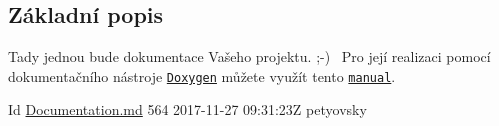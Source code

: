 \subsection*{Základní popis}

Tady jednou bude dokumentace Vašeho projektu. ;-\/)~\newline
Pro její realizaci pomocí dokumentačního nástroje \href{http://www.doxygen.org}{\tt Doxygen} můžete využít tento \href{http://www.doxygen.org/manual/index.html}{\tt manual}.

\begin{DoxyParagraph}{Id}
\hyperlink{_documentation_8md}{Documentation.\+md} 564 2017-\/11-\/27 09\+:31\+:23Z petyovsky 
\end{DoxyParagraph}
